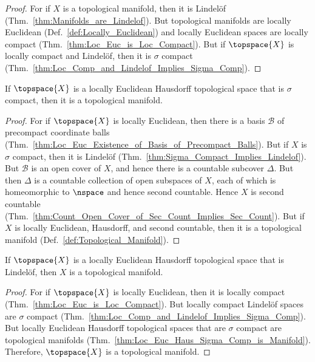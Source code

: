 \documentclass{article}                                                        %
\begin{document}
            \begin{proof}
                For if $X$ is a topological manifold, then it is Lindel\"{o}f
                (Thm.~\ref{thm:Manifolds_are_Lindelof}). But topological manifolds
                are locally Euclidean (Def.~\ref{def:Locally_Euclidean}) and locally
                Euclidean spaces are locally compact
                (Thm.~\ref{thm:Loc_Euc_is_Loc_Compact}). But if $\topspace{X}$ is
                locally compact and Lindel\"{o}f, then it is $\sigma$ compact
                (Thm.~\ref{thm:Loc_Comp_and_Lindelof_Implies_Sigma_Comp}).
            \end{proof}
            \begin{theorem}
                \label{thm:Loc_Euc_Haus_Sigma_Comp_is_Manifold}%
                If $\topspace{X}$ is a locally Euclidean Hausdorff topological
                space that is $\sigma$ compact, then it is a topological manifold.
            \end{theorem}
            \begin{proof}
                For if $\topspace{X}$ is locally Euclidean, then there is a basis
                $\mathcal{B}$ of precompact coordinate balls
                (Thm.~\ref{thm:Loc_Euc_Existence_of_Basis_of_Precompact_Balls}).
                But if $X$ is $\sigma$ compact, then it is Lindel\"{o}f
                (Thm.~\ref{thm:Sigma_Compact_Implies_Lindelof}). But $\mathcal{B}$
                is an open cover of $X$, and hence there is a countable subcover
                $\Delta$. But then $\Delta$ is a countable collection of open
                subspaces of $X$, each of which is homeomorphic to
                $\nspace$ and hence second countable. Hence $X$ is second countable
                (Thm.~\ref{thm:Count_Open_Cover_of_Sec_Count_Implies_Sec_Count}).
                But if $X$ is locally Euclidean, Hausdorff, and second countable,
                then it is a topological manifold
                (Def.~\ref{def:Topological_Manifold}).
            \end{proof}
            \begin{theorem}
                \label{thm:Loc_Euc_Hausdorff_Lindelof_is_Manifold}%
                If $\topspace{X}$ is a locally Euclidean Hausdorff topological space
                that is Lindel\"{o}f, then $X$ is a topological manifold.
            \end{theorem}
            \begin{proof}
                For if $\topspace{X}$ is locally Euclidean, then it is locally
                compact (Thm.~\ref{thm:Loc_Euc_is_Loc_Compact}). But locally compact
                Lindel\"{o}f spaces are $\sigma$ compact
                (Thm.~\ref{thm:Loc_Comp_and_Lindelof_Implies_Sigma_Comp}). But
                locally Euclidean Hausdorff topological spaces that are $\sigma$
                compact are topological manifolds
                (Thm.~\ref{thm:Loc_Euc_Haus_Sigma_Comp_is_Manifold}). Therefore,
                $\topspace{X}$ is a topological manifold.
            \end{proof}
\end{document}
